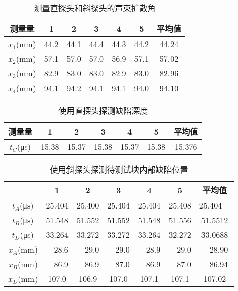 \begin{table}[!ht]
    \caption{测量直探头和斜探头的声束扩散角}\label{tab:A7.exp6}
    \begin{tabularx}{\textwidth}{*{7}{C}} \toprule
        测量量 & 1 & 2 & 3 & 4 & 5 & 平均值 \\ \midrule
        $x_1$(\unit{\mm}) & 44.2 & 44.1 & 44.4 & 44.3 & 44.2 & 44.24 \\ 
        $x_2$(\unit{\mm}) & 57.1 & 57.0 & 57.0 & 56.9 & 57.1 & 57.02 \\ 
        $x_3$(\unit{\mm}) & 82.9 & 83.0 & 83.0 & 82.9 & 83.0 & 82.96 \\ 
        $x_4$(\unit{\mm}) & 94.1 & 94.2 & 94.1 & 94.1 & 94.0 & 94.10 \\ \bottomrule
    \end{tabularx}
\end{table}

\begin{table}[!ht]
    \caption{使用直探头探测缺陷深度}\label{tab:A7.exp7}
    \begin{tabularx}{\textwidth}{*{7}{C}} \toprule
        测量量 & 1 & 2 & 3 & 4 & 5 & 平均值 \\ \midrule
        $t_C$(\unit{\us}) & 15.38 & 15.37 & 15.38 & 15.37 & 15.38 & 15.376 \\ \bottomrule
    \end{tabularx}
\end{table}

\begin{table}[!ht]
    \caption{使用斜探头探测待测试块内部缺陷位置}\label{tab:A7.exp8}
    \begin{tabularx}{\textwidth}{*{7}{C}} \toprule
        ~ & 1 & 2 & 3 & 4 & 5 & 平均值 \\ \midrule
        $t_A$(\unit{\us}) & 25.404 & 25.400 & 25.404 & 25.404 & 25.408 & 25.404~~{} \\
        $t_B$(\unit{\us}) & 51.548 & 51.552 & 51.552 & 51.548 & 51.556 & 51.5512 \\
        $t_D$(\unit{\us}) & 33.264 & 33.272 & 33.272 & 33.264 & 32.272 & 33.0688 \\[2mm]
        $x_A$(\unit{\mm}) & ~~28.6 & ~~29.0 & ~~29.0 & ~~28.9 & ~~29.0 & ~~28.90 \\
        $x_B$(\unit{\mm}) & ~~86.9 & ~~86.9 & ~~87.0 & ~~86.9 & ~~87.0 & ~~86.94 \\
        $x_D$(\unit{\mm}) & 107.0 & 106.9 & 107.0 & 107.1 & 107.1 & 107.02 \\
        \bottomrule
    \end{tabularx}
\end{table}
\clearpage
